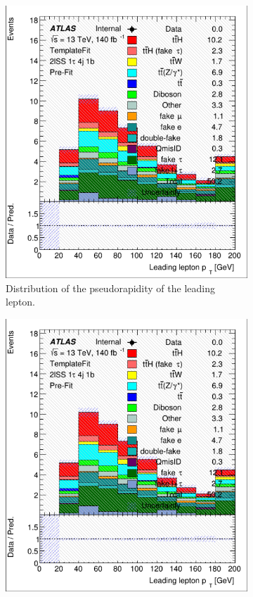 \begin{figure}[htb!]
    \begin{subfigure}{0.45\textwidth}
        \includegraphics[width=\linewidth]{figures/plots/histograms/lep_Eta_0.png}
        \caption{Distribution of the pseudorapidity of the leading lepton.}
        \label{fig:lep_Eta_0}
    \end{subfigure}\hfill%
    \begin{subfigure}{0.45\textwidth}
        \includegraphics[width=\linewidth]{figures/plots/histograms/lep_Eta_1.png}

\end{subfigure}
\end{figure}
